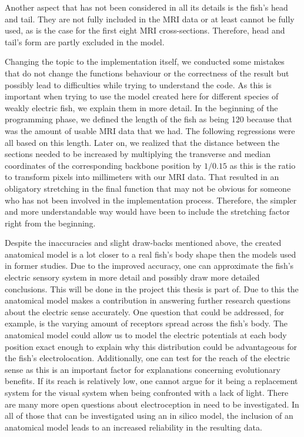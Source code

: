 Another aspect that has not been considered in all its details is the fish's head and tail. They are not fully included in the MRI data or at least cannot be fully used, as is the case for the first eight MRI cross-sections. Therefore, head and tail's form are partly excluded in the model.

Changing the topic to the implementation itself, we conducted some mistakes that do not change the functions behaviour or the correctness of the result but possibly lead to difficulties while trying to understand the code. As this is important when trying to use the model created here for different species of weakly electric fish, we explain them in more detail. In the beginning of the programming phase, we defined the length of the fish as being 120 because that was the amount of usable MRI data that we had. The following regressions were all based on this length. Later on, we realized that the distance between the sections needed to be increased by multiplying the transverse and median coordinates of the corresponding backbone position by $1/0.15$ as this is the ratio to transform pixels into millimeters with our MRI data. That resulted in an obligatory stretching in the final function that may not be obvious for someone who has not been involved in the implementation process. Therefore, the simpler and more understandable way would have been to include the stretching factor right from the beginning. 

Despite the inaccuracies and slight draw-backs mentioned above, the created anatomical model is a lot closer to a real fish's body shape then the models used in former studies. Due to the improved accuracy, one can approximate the fish's electric sensory system in more detail and possibly draw more detailed conclusions. This will be done in the project this thesis is part of. Due to this the anatomical model makes a contribution in answering further research questions about the electric sense accurately. One question that could be addressed, for example, is the varying amount of receptors spread across the fish's body. The anatomical model could allow us to model the electric potentials at each body position exact enough to explain why this distribution could be advantageous for the fish's electrolocation. Additionally, one can test for the reach of the electric sense as this is an important factor for explanations concerning evolutionary benefits. If its reach is relatively low, one cannot argue for it being a replacement system for the visual system when being confronted with a lack of light. There are many more open questions about electroception in need to be investigated. In all of those that can be investigated using an in silico model, the inclusion of an anatomical model leads to an increased reliability in the resulting data. 

